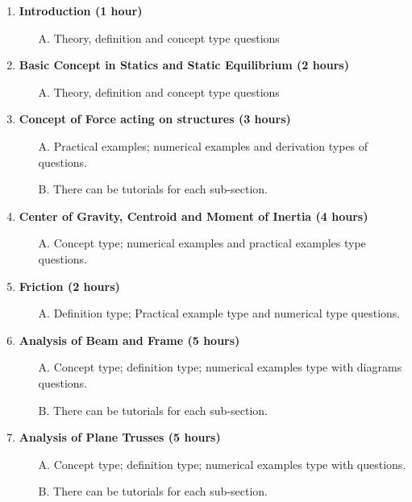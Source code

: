 \begin{enumerate}
    \item \textbf{Introduction \hfill (1 hour)}
    \begin{itemize}
       \item[A.] Theory, definition and concept type questions
    \end{itemize}
    \item \textbf{Basic Concept in Statics and Static Equilibrium \hfill (2 hours)}
      \begin{itemize}
       \item[A.] Theory, definition and concept type questions
    \end{itemize}
    \item \textbf{Concept of Force acting on structures \hfill (3 hours)}
      \begin{itemize}
       \item[A.] Practical examples; numerical examples and derivation types of questions.
       \item[B.] There can be tutorials for each sub-section.
    \end{itemize}
    \item \textbf{Center of Gravity, Centroid and Moment of Inertia \hfill (4 hours)}
      \begin{itemize}
       \item[A.] Concept type; numerical examples and practical examples type questions.
    \end{itemize}
    
    \item \textbf{Friction \hfill (2 hours)}
      \begin{itemize}
       \item[A.] Definition type; Practical example type and numerical type questions.
    \end{itemize}
    
    \item \textbf{Analysis of Beam and Frame \hfill (5 hours)}
      \begin{itemize}
       \item[A.] Concept type; definition type; numerical examples type with diagrams questions.
       \item[B.] There can be tutorials for each sub-section.
    \end{itemize}
    
    \item \textbf{Analysis of Plane Trusses \hfill (5 hours)}
      \begin{itemize}
       \item[A.] Concept type; definition type; numerical examples type with questions.
       \item[B.] There can be tutorials for each sub-section.
    \end{itemize}
    

\end{enumerate}
